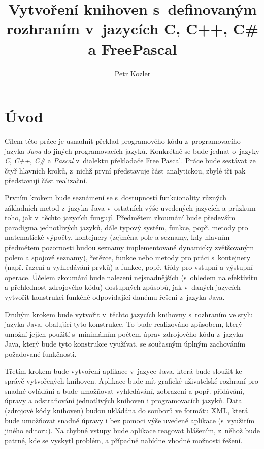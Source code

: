 \documentclass{bakalarka}
\author{Petr Kozler}
\title{Vytvoření knihoven s~definovaným rozhraním v~jazycích C, C++, C\# a FreePascal}
\begin{document}
\pagestyle{fancy}
\renewcommand{\chaptermark}[1]{\markboth{\textit{#1}}{}}
\renewcommand{\sectionmark}[1]{\markright{\textit{#1}}{}}
\cfoot{\thepage}
\lhead{\leftmark}
\rhead{\rightmark}
\maketitle

\chapter{Úvod}
Cílem této práce je usnadnit překlad programového kódu z~programovacího jazyka \textit{Java} do jiných programovacích jazyků. Konkrétně se bude jednat o~jazyky \textit{C}, \textit{C++}, \textit{C\#} a \textit{Pascal} v~dialektu překladače Free Pascal. Práce bude sestávat ze čtyř hlavních kroků, z~nichž první představuje část analytickou, zbylé tři pak představují část realizační.\par
Prvním krokem bude seznámení se s~dostupností funkcionality různých základních metod z~jazyka Java v~ostatních výše uvedených jazycích a průzkum toho, jak v~těchto jazycích fungují. Předmětem zkoumání bude především paradigma jednotlivých jazyků, dále typový systém, funkce, popř. metody pro matematické výpočty, kontejnery (zejména pole a seznamy, kdy hlavním předmětem pozornosti budou seznamy implementované dynamicky zvětšovaným polem a spojové seznamy), řetězce, funkce nebo metody pro práci s~kontejnery (např. řazení a vyhledávání prvků) a funkce, popř. třídy pro vstupní a výstupní operace. Účelem zkoumání bude nalezení nejsnadnějších (s~ohledem na efektivitu a přehlednost zdrojového kódu) dostupných způsobů, jak v~daných jazycích vytvořit konstrukci funkčně odpovídající danému řešení z~jazyka Java.\par
Druhým krokem bude vytvořit v~těchto jazycích knihovny s~rozhraním ve stylu jazyka Java, obalující tyto konstrukce. To bude realizováno způsobem, který umožní jejich použití s~minimálním počtem úprav zdrojového kódu z~jazyka Java, který bude tyto konstrukce využívat, se současným úplným zachováním požadované funkčnosti.\par
Třetím krokem bude vytvoření aplikace v~jazyce Java, která bude sloužit ke správě vytvořených knihoven. Aplikace bude mít grafické uživatelské rozhraní pro snadné ovládání a bude umožňovat vyhledávání, zobrazení a popř. přidávání, úpravy a odstraňování jednotlivých knihoven i programovacích jazyků. Data (zdrojové kódy knihoven) budou ukládána do souborů ve formátu XML, která bude umožňovat snadné úpravy i bez pomoci výše uvedené aplikace (s~využitím jiného editoru). Na chybné vstupy bude aplikace reagovat hlášením, z~něhož bude patrné, kde se vyskytl problém, a případně nabídne vhodné možnosti řešení.\par
\end{document}
